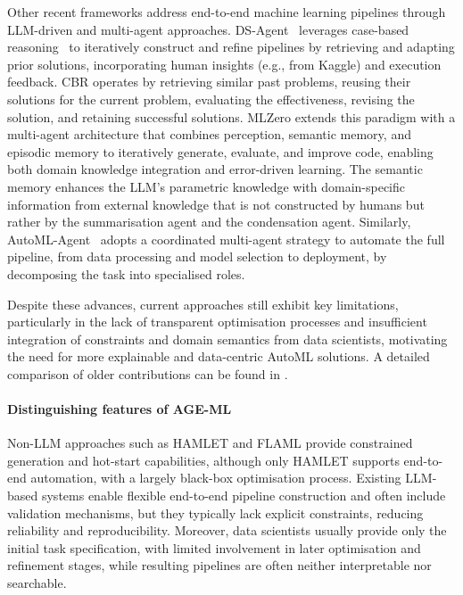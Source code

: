 \documentclass[runningheads]{llncs}
\newcommand{\ourapproach}[0]{\textsc{AGE-ML}}
\begin{document}
Other recent frameworks address end-to-end machine learning pipelines through \ac{LLM}-driven and multi-agent approaches.
%
DS-Agent~\cite{DBLP:conf/icml/GuoD0C0024} leverages case-based reasoning~\cite{kolodner1992introduction}
to iteratively construct and refine pipelines by retrieving and adapting prior solutions,
incorporating human insights
(e.g., from Kaggle)
and execution feedback.
%
CBR operates by retrieving similar past problems,
reusing their solutions for the current problem,
evaluating the effectiveness,
revising the solution,
and
retaining successful solutions.
%
MLZero \cite{DBLP:journals/corr/abs-2505-13941} extends this paradigm with a multi-agent architecture
that combines perception, semantic memory, and episodic memory
to iteratively generate, evaluate, and improve code,
enabling both domain knowledge integration and error-driven learning.
%
The semantic memory enhances the \ac{LLM}'s parametric knowledge with domain-specific information
from external knowledge that is not constructed by humans but rather by the summarisation agent
and the condensation agent.
%
Similarly,
AutoML-Agent~\cite{DBLP:conf/icml/TriratJH25} adopts a coordinated multi-agent strategy to automate the full pipeline,
from data processing and model selection to deployment,
by decomposing the task into specialised roles.

Despite these advances,
current approaches still exhibit key limitations,
particularly in the lack of transparent optimisation processes and insufficient integration of constraints and domain semantics from data scientists,
motivating the need for more explainable and data-centric \ac{AutoML} solutions.
%
A detailed comparison of older contributions can be found in \cite{DBLP:conf/icml/TriratJH25}.

\paragraph{Distinguishing features of \ourapproach{}}

% 

%
Non-\ac{LLM} approaches such as HAMLET and FLAML provide constrained generation and hot-start capabilities,
although only HAMLET supports end-to-end automation, with a largely black-box optimisation process.
%
Existing \ac{LLM}-based systems enable flexible end-to-end pipeline construction and often include validation mechanisms,
but they typically lack explicit constraints, reducing reliability and reproducibility.
%
Moreover, data scientists usually provide only the initial task specification,
with limited involvement in later optimisation and refinement stages,
while resulting pipelines are often neither interpretable nor searchable.
\end{document}
